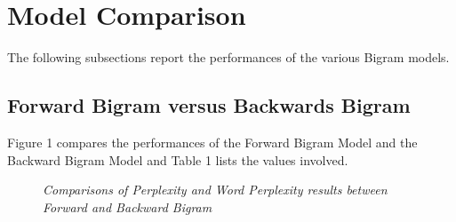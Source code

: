 \documentclass{article} %
\begin{document}
\section{Model Comparison}
The following subsections report the performances of the various Bigram models.
\subsection{Forward Bigram versus Backwards Bigram}

Figure 1 compares the performances of the Forward Bigram Model and the Backward Bigram Model and Table 1 lists the values involved.

\begin{figure}[h]%
	\centering
    	\hfill%
    \caption{\textit{Comparisons of Perplexity and Word Perplexity results between Forward and Backward Bigram}}
    \label{fig:default}
\end{figure}
\end{document}
